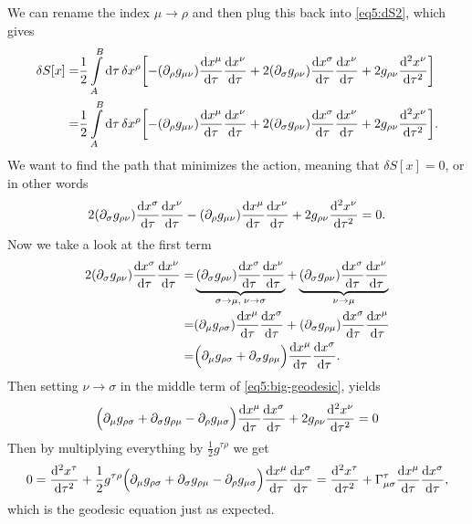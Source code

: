 \documentclass[11pt,a4paper, 
swedish, english %
]{article}
\begin{document}
We can rename the index $\mu\to\rho$ and then plug this back into
\eqref{eq5:dS2}, which gives
\begin{equation}%
\begin{aligned}
\delta{S}[x]=&\frac{1}{2}\int_A^B\rd\tau\,\delta{x}^\rho
\qty[ -(\pd_{\rho}g_{\mu\nu})\dv{x^\mu}{\tau}\dv{x^\nu}{\tau}
+2(\pd_\sigma g_{\rho\nu})\dv{x^\sigma}{\tau}\dv{x^\nu}{\tau}
+2g_{\rho\nu}\dv[2]{x^\nu}{\tau} ]\\
=&\frac{1}{2}\int_A^B\rd\tau\,\delta{x}^\rho 
\qty[ -(\pd_{\rho}g_{\mu\nu})\dv{x^\mu}{\tau}\dv{x^\nu}{\tau}
+2(\pd_\sigma g_{\rho\nu})\dv{x^\sigma}{\tau}\dv{x^\nu}{\tau}
+2g_{\rho\nu}\dv[2]{x^\nu}{\tau} ].
\end{aligned}
\end{equation}
We want to find the path that minimizes the action, meaning that
$\delta{S}[x]=0$, or in other words
\begin{equation}\label{eq5:big-geodesic}
2(\partial_\sigma g_{\rho\nu})\dv{x^\sigma}{\tau}\dv{x^\nu}{\tau}
-(\partial_{\rho}g_{\mu\nu})\dv{x^\mu}{\tau}\dv{x^\nu}{\tau}
+2g_{\rho\nu}\dv[2]{x^\nu}{\tau} =0.
\end{equation}
Now we take a look at the first term
\begin{equation}
\begin{aligned}
2(\partial_\sigma g_{\rho\nu})\dv{x^\sigma}{\tau}\dv{x^\nu}{\tau}=&
\underbrace{(\partial_{\sigma}g_{\rho\nu})
  \dv{x^\sigma}{\tau}\dv{x^\nu}{\tau}}
_{\sigma\to\mu,\;\nu\to\sigma}
+\underbrace{(\partial_{\sigma}g_{\rho\nu})
  \dv{x^\sigma}{\tau}\dv{x^\nu}{\tau}}
_{\nu\to\mu}\\
=&(\partial_\mu g_{\rho\sigma})\dv{x^\mu}{\tau}\dv{x^\sigma}{\tau}
+(\partial_\sigma g_{\rho\mu})\dv{x^\sigma}{\tau}\dv{x^\mu}{\tau}\\
=&\Big(\partial_\mu g_{\rho\sigma}+\partial_\sigma g_{\rho\mu}\Big)
\dv{x^\mu}{\tau}\dv{x^\sigma}{\tau}.
\end{aligned}
\end{equation}
Then setting $\nu\to\sigma$ in the middle term of
\eqref{eq5:big-geodesic}, yields
\begin{equation}
\Big(\partial_\mu g_{\rho\sigma}+\partial_\sigma g_{\rho\mu}
-\partial_{\rho}g_{\mu\sigma}\Big)
\dv{x^\mu}{\tau}\dv{x^\sigma}{\tau}
+2g_{\rho\nu}\dv[2]{x^\nu}{\tau} =0
\end{equation}
Then by multiplying everything by $\frac{1}{2}g^{\tau\rho}$ we get
\begin{equation}
0=\dv[2]{x^\tau}{\tau} +
\frac{1}{2}g^{\tau\rho}
\Big(\partial_\mu g_{\rho\sigma}+\partial_\sigma g_{\rho\mu}
-\partial_{\rho}g_{\mu\sigma}\Big)
\dv{x^\mu}{\tau}\dv{x^\sigma}{\tau}
=\dv[2]{x^\tau}{\tau} +
\Gamma^\tau_{\mu\sigma}
\dv{x^\mu}{\tau}\dv{x^\sigma}{\tau},
\end{equation}
which is the geodesic equation just as expected.
\end{document}
